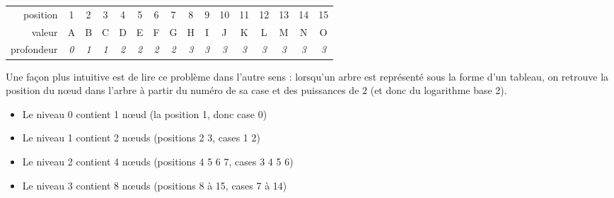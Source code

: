 \documentclass[11pt,a4paper]{article}
\begin{document}
\begin{table}[ht!]
\begin{minipage}{0.65\textwidth}
  \end{minipage}
  \hfillx
  \begin{minipage}{0.10\textwidth}


  \end{minipage}
  \hfillx
  \begin{minipage}{0.0\textwidth}
  \end{minipage}
\end{table}

\begin{center}
\begin{tabular}{ r c cc cccc cccccccc }
position   & 1 & 2 & 3 & 4 & 5 & 6 & 7 & 8 & 9 & 10 & 11 & 12 & 13 & 14 & 15 \\
\cline{2-16}
valeur     & \multicolumn{1}{|c|}{A} &
\multicolumn{1}{c|}{B} & \multicolumn{1}{c|}{C} &
\multicolumn{1}{c|}{D} & \multicolumn{1}{c|}{E} &
  \multicolumn{1}{c|}{F} & \multicolumn{1}{c|}{G} &
\multicolumn{1}{c|}{H} & \multicolumn{1}{c|}{I} & \multicolumn{1}{c|}{J} & \multicolumn{1}{c|}{K} &
  \multicolumn{1}{c|}{L} & \multicolumn{1}{c|}{M} & \multicolumn{1}{c|}{N} & \multicolumn{1}{c|}{O} \\
\cline{2-16}
profondeur & \textit{0} &
\textit{1} & \textit{1} &
\textit{2} & \textit{2} &
  \textit{2} & \textit{2} &
\textit{3} & \textit{3} & \textit{3} & \textit{3} &
  \textit{3} & \textit{3} & \textit{3} & \textit{3} \\
\end{tabular}
\end{center}

\smallskip

Une façon plus intuitive est de lire ce problème dans l'autre sens : lorsqu'un arbre est représenté sous la forme d'un tableau, on retrouve la position du nœud dans l'arbre à partir du numéro de sa case et des puissances de 2 (et donc du logarithme base 2).

\begin{itemize}
\item Le niveau 0 contient 1 nœud (la position 1, donc case 0)
\item Le niveau 1 contient 2 nœuds (positions 2 3, cases 1 2)
\item Le niveau 2 contient 4 nœuds (positions 4 5 6 7, cases 3 4 5 6)
\item Le niveau 3 contient 8 nœuds (positions 8 à 15, cases 7 à 14)
\end{itemize}
\end{document}
